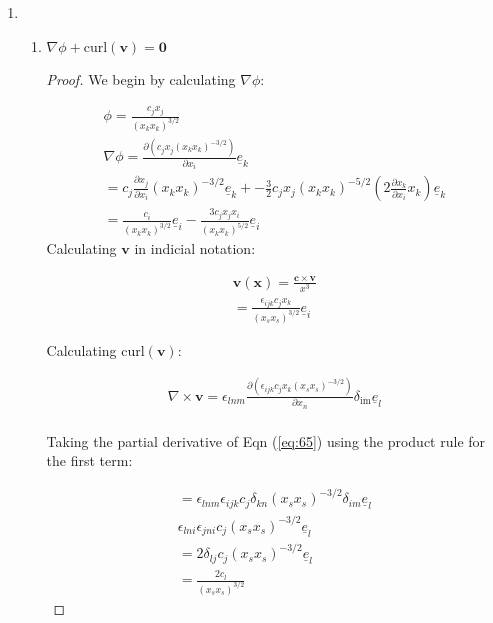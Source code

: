 \begin{enumerate}
\begin{enumerate}
        \end{enumerate}
        \item
        \begin{enumerate}
            \item $\nabla \phi+\text{curl}(\mathbf{v})=\mathbf{0}$
            \begin{proof}
                We begin by calculating $\nabla \phi$:

                \begin{align}
                \phi=\frac{c_{j}x_{j}}{(x_{k}x_{k})^{3/2}} \\
                \nabla \phi=\frac{ \partial (c_{j}x_{j}(x_{k}x_{k})^{-3/2}) }{ \partial x_{i} } \underline{e}_{k} \\
                =c_{j}\frac{ \partial x_{j} }{ \partial x_{i} } (x_{k}x_{k})^{-3/2}\underline{e}_{k}+ -\frac{3}{2}c_{j}x_{j}(x_{k}x_{k})^{-5/2}\left( 2\frac{ \partial x_{k} }{ \partial x_{i} } x_{k} \right)\underline{e}_{k} \\
                =\frac{c_{i}}{(x_{k}x_{k})^{3/2}}\underline{e}_{i}-\frac{3c_{j}x_{j}x_{i}}{(x_{k}x_{k})^{5/2}}\underline{e}_{i} \label{eq:62}
                \end{align}
                Calculating $\mathbf{v}$ in indicial notation:

\begin{align}
\mathbf{v}(\mathbf{x})=\frac{\mathbf{c}\times \mathbf{v}}{x^3} \\
=\frac{\epsilon_{ijk}c_{j}x_{k}}{(x_{s}x_{s})^{3/2}}\underline{e}_{i}
\end{align}

Calculating $\text{curl}(\mathbf{v})$:


\begin{align}
\nabla \times \mathbf{v}=\epsilon_{lnm}\frac{ \partial (\epsilon_{ijk}c_{j}x_{k}(x_{s}x_{s})^{-3/2}) }{ \partial x_{n} } \delta_{\mathrm{im}}\underline{e}_{l} \label{eq:65} \\
\end{align}


Taking the partial derivative of Eqn (\ref{eq:65}) using the product rule for the first term:


\begin{align}
=\epsilon_{lnm}\epsilon_{ijk}c_{j}\delta_{kn}(x_{s}x_{s})^{-3/2}\delta_{im}\underline{e}_{l} \\
\epsilon_{lni}\epsilon_{jni}c_{j}(x_{s}x_{s})^{-3/2}\underline{e}_{l} \\
=2\delta_{lj}c_{j}(x_{s}x_{s})^{-3/2}\underline{e}_{l} \\
=\frac{2c_{l}}{(x_{s}x_{s})^{3/2}}
\end{align}


\end{proof}
\end{enumerate}
\end{enumerate}
